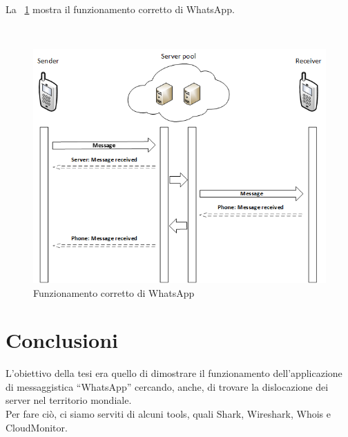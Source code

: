 \documentclass[a4paper,11pt]{book}
\begin{document}
La \figurename ~\ref{fig:lan} mostra il funzionamento corretto di WhatsApp.  

~

\begin{figure}[!ht]
\centering
\includegraphics[scale = 0.8]{true_lan.png}
\caption{Funzionamento corretto di WhatsApp}
\label{fig:lan}
\end{figure}



\chapter{Conclusioni}
L'obiettivo della tesi era quello di dimostrare il funzionamento dell'applicazione di messaggistica ``WhatsApp'' cercando, anche, di trovare la dislocazione dei server nel territorio mondiale.\\
Per fare ci\`o, ci siamo serviti di alcuni tools, quali Shark, Wireshark, Whois e CloudMonitor.
\end{document}

